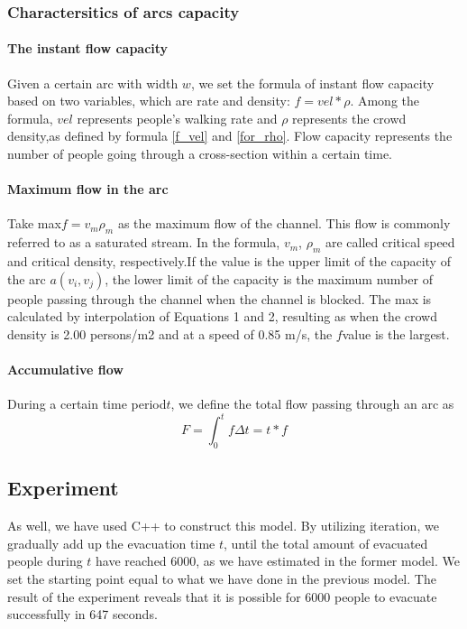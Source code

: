 \documentclass{mcmthesis}
\begin{document}
	\subsubsection{Charactersitics of arcs capacity}
	
	\paragraph{The instant flow capacity }
	Given a certain arc with width $w$, we set the  formula of instant flow capacity based on two variables, which are  rate and density: $f=vel * \rho$.  Among the formula, $vel$ represents people's walking rate and $\rho$ represents the crowd density,as defined by formula \ref{f_vel} and \ref{for_rho}. Flow capacity represents the number of people going through a cross-section within a certain time.
	
	\paragraph{Maximum flow in the arc }
	
	Take max$f=v_m\rho_m$ as the maximum flow of the channel. This flow is commonly referred to as a saturated stream. In the formula, $v_m$, $\rho_m$ are called critical speed and critical density, respectively.If the value is the upper limit of the capacity of the arc $a(v_i,v_j)$, the lower limit of the capacity is the maximum number of people passing through the channel when the channel is blocked. The max is calculated by interpolation of Equations 1 and 2, resulting as when the crowd density is 2.00 persons/m2 and at a speed of 0.85 m/s, the $f​$value is the largest.
	
	\paragraph{Accumulative flow}
	During a certain time period$t$, we define the total flow passing through an arc as 
	$$
	F = \int _{0}^{t} f \Delta t = t * f
	$$
	
	\subsection{Experiment}
	
	As well, we have used C++ to construct this model. By utilizing iteration, we gradually add up the evacuation time $t$, until the total amount of evacuated people during $t$ have reached 6000, as we have estimated in the former model. We set the starting point equal to what we have done in the previous model.
	The result of the experiment reveals that it is possible for 6000 people to evacuate successfully in 647 seconds.
	
\end{document}
